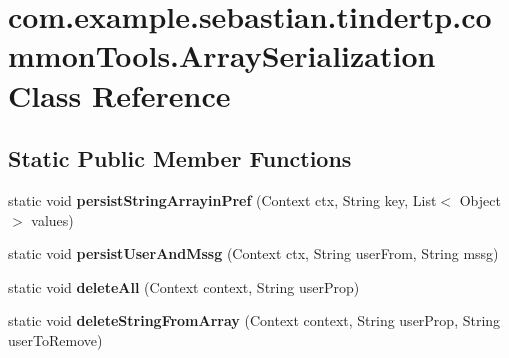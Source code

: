 \hypertarget{classcom_1_1example_1_1sebastian_1_1tindertp_1_1commonTools_1_1ArraySerialization}{}\section{com.\+example.\+sebastian.\+tindertp.\+common\+Tools.\+Array\+Serialization Class Reference}
\label{classcom_1_1example_1_1sebastian_1_1tindertp_1_1commonTools_1_1ArraySerialization}
\subsection*{Static Public Member Functions}
\begin{DoxyCompactItemize}
\item 
static void {\bfseries persist\+String\+Arrayin\+Pref} (Context ctx, String key, List$<$ Object $>$ values)\hypertarget{classcom_1_1example_1_1sebastian_1_1tindertp_1_1commonTools_1_1ArraySerialization_a483304bbf70677d9e5d5462a4e9eb7ec}{}\label{classcom_1_1example_1_1sebastian_1_1tindertp_1_1commonTools_1_1ArraySerialization_a483304bbf70677d9e5d5462a4e9eb7ec}

\item 
static void {\bfseries persist\+User\+And\+Mssg} (Context ctx, String user\+From, String mssg)\hypertarget{classcom_1_1example_1_1sebastian_1_1tindertp_1_1commonTools_1_1ArraySerialization_a059e1462d2af7c9ae29adb518d05796c}{}\label{classcom_1_1example_1_1sebastian_1_1tindertp_1_1commonTools_1_1ArraySerialization_a059e1462d2af7c9ae29adb518d05796c}

\item 
static void {\bfseries delete\+All} (Context context, String user\+Prop)\hypertarget{classcom_1_1example_1_1sebastian_1_1tindertp_1_1commonTools_1_1ArraySerialization_a3c004fb3a6191dac97c580fa200a4adf}{}\label{classcom_1_1example_1_1sebastian_1_1tindertp_1_1commonTools_1_1ArraySerialization_a3c004fb3a6191dac97c580fa200a4adf}

\item 
static void {\bfseries delete\+String\+From\+Array} (Context context, String user\+Prop, String user\+To\+Remove)\hypertarget{classcom_1_1example_1_1sebastian_1_1tindertp_1_1commonTools_1_1ArraySerialization_a59509c94b3cfc741476b5d9586a350c4}{}\label{classcom_1_1example_1_1sebastian_1_1tindertp_1_1commonTools_1_1ArraySerialization_a59509c94b3cfc741476b5d9586a350c4}


\end{DoxyCompactItemize}
